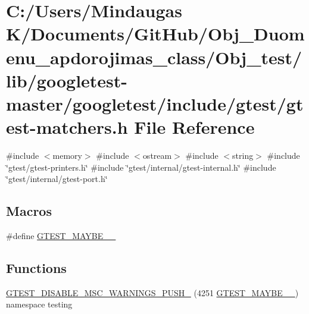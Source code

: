 \hypertarget{_obj__test_2lib_2googletest-master_2googletest_2include_2gtest_2gtest-matchers_8h}{}\section{C\+:/\+Users/\+Mindaugas K/\+Documents/\+Git\+Hub/\+Obj\+\_\+\+Duomenu\+\_\+apdorojimas\+\_\+class/\+Obj\+\_\+test/lib/googletest-\/master/googletest/include/gtest/gtest-\/matchers.h File Reference}
\label{_obj__test_2lib_2googletest-master_2googletest_2include_2gtest_2gtest-matchers_8h}
{\ttfamily \#include $<$memory$>$}\newline
{\ttfamily \#include $<$ostream$>$}\newline
{\ttfamily \#include $<$string$>$}\newline
{\ttfamily \#include \char`\"{}gtest/gtest-\/printers.\+h\char`\"{}}\newline
{\ttfamily \#include \char`\"{}gtest/internal/gtest-\/internal.\+h\char`\"{}}\newline
{\ttfamily \#include \char`\"{}gtest/internal/gtest-\/port.\+h\char`\"{}}\newline
\subsection*{Macros}
\begin{DoxyCompactItemize}
\item 
\#define \mbox{\hyperlink{_obj__test_2lib_2googletest-master_2googletest_2include_2gtest_2gtest-matchers_8h_a71fe8dfcd1a8cd227fc47558f26452b9}{G\+T\+E\+S\+T\+\_\+\+M\+A\+Y\+B\+E\+\_\+\_\+}}
\end{DoxyCompactItemize}
\subsection*{Functions}
\begin{DoxyCompactItemize}
\item 
\mbox{\hyperlink{_obj__test_2lib_2googletest-master_2googletest_2include_2gtest_2gtest-matchers_8h_ae9b7a8d33bcb4bbad774b324eeeb23d6}{G\+T\+E\+S\+T\+\_\+\+D\+I\+S\+A\+B\+L\+E\+\_\+\+M\+S\+C\+\_\+\+W\+A\+R\+N\+I\+N\+G\+S\+\_\+\+P\+U\+S\+H\+\_\+}} (4251 \mbox{\hyperlink{_obj__test_2lib_2googletest-master_2googletest_2include_2gtest_2gtest-matchers_8h_a71fe8dfcd1a8cd227fc47558f26452b9}{G\+T\+E\+S\+T\+\_\+\+M\+A\+Y\+B\+E\+\_\+\_\+}}) namespace testing
\end{DoxyCompactItemize}


